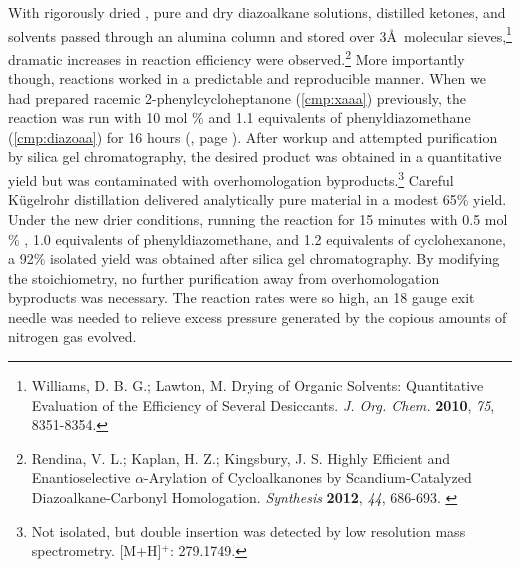 With rigorously dried , pure and dry diazoalkane solutions, distilled ketones, and
solvents passed through an alumina column and stored over 3\AA\ molecular
sieves,\footnote{{\frenchspacing Williams, D.
B.
G.; Lawton, M.
Drying of Organic Solvents: Quantitative Evaluation of the Efficiency of Several Desiccants.
\textit{J. Org. Chem.} \textbf{2010}, \textit{75}, 8351-8354.}} dramatic increases in reaction
efficiency were observed.\footnote{{\frenchspacing Rendina, V. L.; Kaplan, H. Z.; Kingsbury, J. S.
Highly Efficient and Enantioselective $\alpha$-Arylation of Cycloalkanones by Scandium-Catalyzed
Diazoalkane-Carbonyl Homologation. \textit{Synthesis} \textbf{2012}, \textit{44}, 686-693.}
\label{ref:asrendinapsp}} More importantly though, reactions worked in a predictable and
reproducible manner.
When we had prepared racemic 2-phenylcycloheptanone (\ref{cmp:xaaa}) previously,
the reaction was run with 10 mol \%  and 1.1 equivalents of phenyldiazomethane
(\ref{cmp:diazoaa}) for 16 hours (,
page \pageref{sch:asracemizationone}).
After workup and attempted purification by silica gel chromatography, the desired product was obtained in a quantitative yield but was contaminated with overhomologation byproducts.\footnote{Not isolated, but double insertion was detected by low resolution mass spectrometry.  [M+H]$^+$: 279.1749.} Careful K\"{u}gelrohr distillation delivered analytically pure material in a modest 65\% yield. Under the new drier conditions, running the reaction for 15 minutes with 0.5 mol \% , 1.0
equivalents of phenyldiazomethane, and 1.2 equivalents of cyclohexanone, a 92\% isolated yield was
obtained after silica gel chromatography. By modifying the stoichiometry, no further purification
away from overhomologation byproducts was necessary. The reaction rates were so high, an 18 gauge
exit needle was needed to relieve excess pressure generated by the copious amounts of nitrogen gas evolved.
